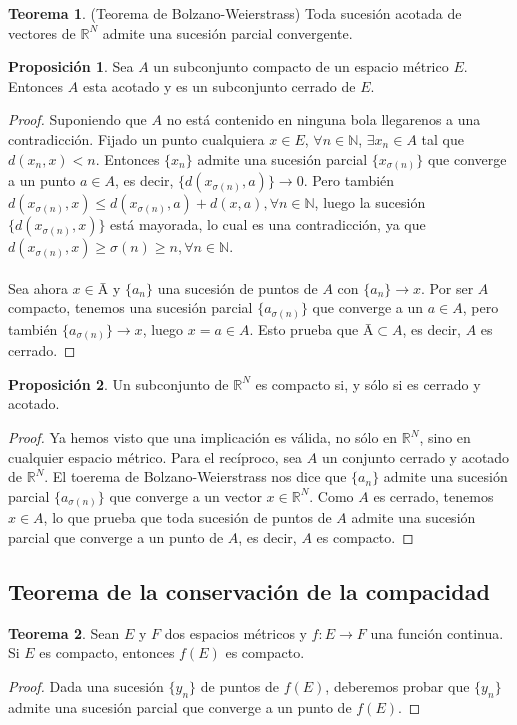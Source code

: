\documentclass[11pt,titlepage,a4paper]{article}
\theoremstyle{definition}
\newtheorem*{teo}{Teorema}
\newtheorem*{prop}{Proposición}
\begin{document}
\begin{teo}
(Teorema de Bolzano-Weierstrass) Toda sucesión acotada de vectores de $\mathbb{R}^N$
admite una sucesión parcial convergente.
\end{teo}
\begin{prop}
Sea $A$ un subconjunto compacto de un espacio métrico $E$. Entonces $A$ esta acotado y es
un subconjunto cerrado de $E$.
\end{prop}
\begin{proof}
Suponiendo que $A$ no está contenido en ninguna bola llegarenos a una contradicción.
Fijado un punto cualquiera $x\in E$, $\forall n\in\mathbb{N}$, $\exists x_n\in A$ tal que
$d(x_n,x)<n$. Entonces $\{x_n\}$ admite una sucesión parcial $\{x_{\sigma(n)}\}$ que
converge a un punto $a\in A$, es decir, $\{d(x_{\sigma(n)},a)\}\to 0$. Pero también
$d(x_{\sigma(n)},x)\leq d(x_{\sigma(n)},a)+d(x,a),\forall n\in\mathbb{N}$, luego la 
sucesión $\{d(x_{\sigma(n)},x)\}$ está mayorada, lo cual es una contradicción, ya que
$d(x_{\sigma(n)},x)\geq\sigma(n)\geq n,\forall n\in\mathbb{N}$.
\\\\
Sea ahora $x\in\text{\=A}$ y $\{a_n\}$ una sucesión de puntos de $A$ con $\{a_n\}\to x$.
Por ser $A$ compacto, tenemos una sucesión parcial $\{a_{\sigma(n)}\}$ que converge a
un $a\in A$, pero también $\{a_{\sigma(n)}\}\to x$, luego $x=a\in A$. Esto prueba que
$\text{\=A}\subset A$, es decir, $A$ es cerrado.
\end{proof}
\begin{prop}
Un subconjunto de $\mathbb{R}^N$ es compacto si, y sólo si es cerrado y acotado.
\end{prop}
\begin{proof}
Ya hemos visto que una implicación es válida, no sólo en $\mathbb{R}^N$, sino en cualquier
espacio métrico. Para el recíproco, sea $A$ un conjunto cerrado y acotado de $\mathbb{R}^N$.
El toerema de Bolzano-Weierstrass nos dice que $\{a_n\}$ admite una sucesión parcial
$\{a_{\sigma(n)}\}$ que converge a un vector $x\in\mathbb{R}^N$. Como $A$ es cerrado, tenemos
$x\in A$, lo que prueba que toda sucesión de puntos de $A$ admite una sucesión parcial
que converge a un punto de $A$, es decir, $A$ es compacto.
\end{proof}

\subsection{Teorema de la conservación de la compacidad}

\begin{teo}
Sean $E$ y $F$ dos espacios métricos y $f:E\to F$ una función continua. Si $E$ es compacto, 
entonces $f(E)$ es compacto.
\end{teo}
\begin{proof}
Dada una sucesión $\{y_n\}$ de puntos de $f(E)$, deberemos probar que $\{y_n\}$ admite
una sucesión parcial que converge a un punto de $f(E)$.
\end{proof}
\end{document}
